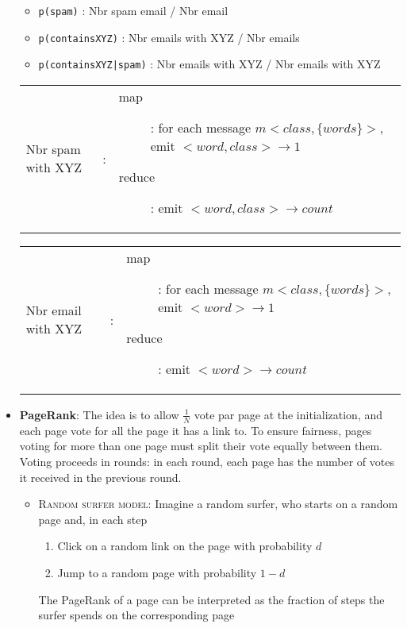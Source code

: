 \begin{itemize}
        \begin{itemize}
            \item \texttt{p(spam)} : Nbr spam email / Nbr email
            \item \texttt{p(containsXYZ)} : Nbr emails with XYZ / Nbr emails
            \item \texttt{p(containsXYZ|spam)} : Nbr emails with XYZ / Nbr emails with XYZ
        \end{itemize}

        \begin{tabular}{m{2cm}cm{13cm}}
            Nbr spam with XYZ &:
            & 
            \begin{description}
                \item[map]: for each message $m <class, \{words\}>$, emit $<word, class> \rightarrow 1$
                \item[reduce]: emit $<word, class> \rightarrow count$
            \end{description}
        \end{tabular}

        \begin{tabular}{m{2cm}cm{12cm}}
            Nbr email with XYZ&:
            & 
            \begin{description}
                \item[map]: for each message $m <class, \{words\}>$, emit $<word> \rightarrow 1$
                \item[reduce]: emit $<word> \rightarrow count$
            \end{description}
        \end{tabular}

    \item \textbf{PageRank}: The idea is to allow $\frac{1}{N}$ vote par page
        at the initialization, and each page vote for all the page it has a
        link to. To ensure fairness, pages voting for more than one page must
        split their vote equally between them. Voting proceeds in rounds: in
        each round, each page has the number of votes it received in the
        previous round.


        \begin{itemize}
            \item \textsc{Random surfer model}: Imagine a random surfer, who starts on a 
                random page and, in each step
                \begin{enumerate}
                    \item Click on a random link on the page with probability $d$ 
                    \item Jump to a random page with probability $1-d$ 
                \end{enumerate}
                The PageRank of a page can be interpreted 
                as the fraction of steps the surfer spends on 
                the corresponding page



\end{itemize}
\end{itemize}
